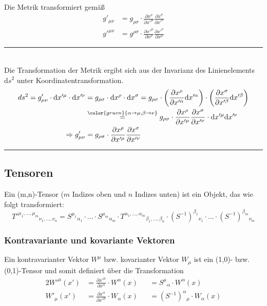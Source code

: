 \documentclass{article}
\newcommand{\diff}{\mathrm{d}}
\newcommand{\lr}[1]{\left(#1\right)}
\newcommand{\comment}[1]{{\color{gruen} {#1}}}
\begin{document}
Die Metrik transformiert gemäß
	\begin{align}
		g'_{\mu\nu} &= g_{\rho\sigma} \cdot \frac{\partial x^\rho}{\partial x'^\mu} \frac{\partial x^\sigma}{\partial x'^\nu} \\
		g'^{\mu\nu} &= g^{\rho\sigma} \cdot \frac{\partial x'^\mu}{\partial x^\rho} \frac{\partial x'^\nu}{\partial x^\sigma}
	\end{align}

{\color{violet}
\hrule
	\\
	Die Transformation der Metrik ergibt sich aus der Invarianz des Linienelements $\diff s^2$ unter Koordinatentransformation.
		\begin{align*}
			ds^2 = g'_{\mu\nu} \cdot \diff x'^\mu \cdot \diff x'^\nu &= g_{\rho\sigma} \cdot \diff x^\rho \cdot \diff x^\sigma = g_{\rho\sigma} \cdot \lr{ \frac{\partial x^\rho}{\partial x'^\alpha} \diff x'^\alpha } \cdot \lr{ \frac{\partial x^\sigma}{\partial x'^\beta} \diff x'^\beta } \\
			&\stackrel{\comment{\alpha\to\mu,\beta\to\nu}}{=} g_{\rho\sigma} \cdot \frac{\partial x^\rho}{\partial x'^\mu} \frac{\partial x^\sigma}{\partial x'^\nu} \cdot \diff x'^\mu \diff x'^\nu \\
			\Rightarrow g'_{\mu\nu} &= g_{\rho\sigma} \cdot \frac{\partial x^\rho}{\partial x'^\mu}\frac{\partial x^\sigma}{\partial x'^\nu}
		\end{align*}
\hrule
}

\subsection{Tensoren}
Ein (m,n)-Tensor \textcolor{gruen}{($m$ Indizes oben und $n$ Indizes unten)} ist ein Objekt, das wie folgt transformiert:
	\begin{equation}
		T'^{\mu_1,...,\mu_m}{}_{\nu_1,...,\nu_n} = S^{\mu_1}{}_{\alpha_1} \cdot ... \cdot S^{\mu_m}{}_{\alpha_m} \cdot T^{\alpha_1,...,\alpha_m}{}_{\beta_1,...,\beta_n} \cdot (S^{-1})^{\beta_1}{}_{\nu_1} \cdot ... \cdot (S^{-1})^{\beta_m}{}_{\nu_m}
	\end{equation}

\subsubsection{Kontravariante und kovariante Vektoren}
Ein kontravarianter Vektor $W^\mu$ bzw. kovarianter Vektor $W_\mu$ ist ein (1,0)- bzw. (0,1)-Tensor und somit definiert über die Transformation
	\begin{alignat}{2}
		W'^\mu(x') &= \frac{\partial x'^\mu}{\partial x^\alpha} \cdot W^\alpha(x) &&= S^\mu{}_\alpha \cdot W^\alpha(x) \\
		W'_\mu(x') &= \frac{\partial x^\alpha}{\partial x'^\mu} \cdot W_\alpha(x) &&= {(S^{-1})}^\alpha{}_\mu \cdot W_\alpha(x)
	\end{alignat}
\end{document}
